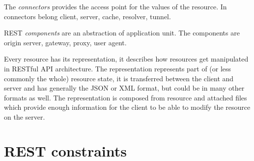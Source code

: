 The \emph{connectors} provides the access point for the values of the resource. In connectors belong client, server, cache, resolver, tunnel. 

REST \emph{components} are an abstraction of application unit. The components are origin server, gateway, proxy, user agent.

Every resource has its representation, it describes how resources get manipulated in RESTful API architecture. The representation represents part of (or less commonly the whole) resource state, it is transferred between the client and server and has generally the JSON or XML format, but could be in many other formats as well. The representation is composed from resource and attached files which provide enough information for the client to be able to modify the resource on the server.

\section{REST constraints}
\label{sec:constraints}

